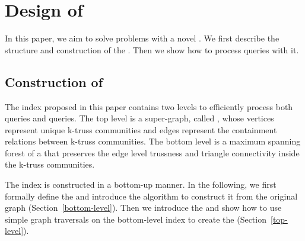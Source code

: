 \section{Design of \TwoLevelIndex{}}
\label{index}

In this paper, we aim to solve \probdef{} problems with a novel \twolevelindex{}. We first describe the structure and construction of the \twolevelindex{}. Then we show how to process queries with it. 

\subsection{Construction of \TwoLevelIndex{}}

The index proposed in this paper contains two levels to efficiently process both \toplevelprob{} queries and \bottomlevelprob{} queries. %
The top level is a super-graph, called \treeindex{}, whose vertices represent unique k-truss communities and edges represent the containment relations between k-truss communities. 
The bottom level is a maximum spanning forest of a \inducedgraph{} that preserves the edge level trussness and triangle connectivity inside the k-truss communities. 

The index is constructed in a bottom-up manner. In the following, we first formally define the \inducedgraph{} and introduce the algorithm to construct it from the original graph (Section~\ref{bottom-level}). Then we introduce the \treeindex{} and show how to use simple graph traversals on the bottom-level index to create the \treeindex{} (Section~\ref{top-level}). 

